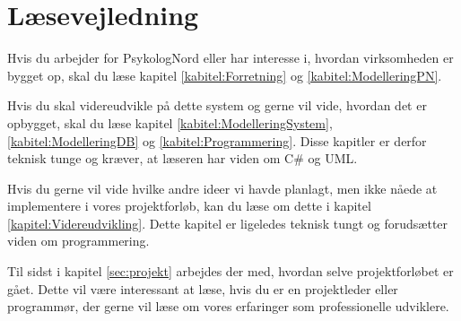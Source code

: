 \section{Læsevejledning}

Hvis du arbejder for PsykologNord eller har interesse i, hvordan virksomheden er bygget op, skal du læse kapitel \ref{kabitel:Forretning} og \ref{kabitel:ModelleringPN}.

Hvis du skal videreudvikle på dette system og gerne vil vide, hvordan det er opbygget, skal du læse kapitel \ref{kabitel:ModelleringSystem}, \ref{kabitel:ModelleringDB} og \ref{kabitel:Programmering}.
Disse kapitler er derfor teknisk tunge og kræver, at læseren har viden om C\# og UML.

Hvis du gerne vil vide hvilke andre ideer vi havde planlagt, men ikke nåede at implementere i vores projektforløb, kan du læse om dette i kapitel \ref{kapitel:Videreudvikling}.
Dette kapitel er ligeledes teknisk tungt og forudsætter viden om programmering.

Til sidst i kapitel \ref{sec:projekt} arbejdes der med, hvordan selve projektforløbet er gået.
Dette vil være interessant at læse, hvis du er en projektleder eller programmør, der gerne vil læse om vores erfaringer som professionelle udviklere.

\newpage
